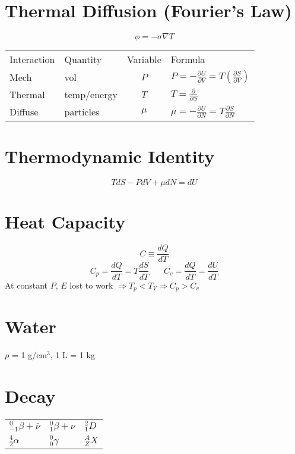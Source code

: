 \documentclass[10pt,a4paper]{article}
\begin{document}
\section{Thermal Diffusion (Fourier's Law)} %
\label{sec:thermal_diffusion_}
\begin{equation}
    \phi = -\sigma \nabla T
\end{equation}

\begin{tabular}{l l c l}
Interaction & Quantity & Variable & Formula\\
Mech & vol & $P$ & $P = -\frac{\partial U}{\partial V}=T \left( \frac{\partial S}{\partial V} \right)$\\
Thermal & temp/energy & $T$ & $T = \frac{\partial }{\partial S}$\\
Diffuse & particles & $\mu$ & $\mu = -\frac{\partial U}{\partial N} = T \frac{\partial S}{\partial N}$
\end{tabular}

\section{Thermodynamic Identity} %
\label{sec:thermo_identity}
\begin{equation}
    T dS - PdV + \mu dN = dU
\end{equation}

\section{Heat Capacity} %
\label{sec:heat_capacity}
\begin{equation}
    C \equiv \frac{dQ}{dT}
\end{equation}
\begin{equation}
    C_p = \frac{dQ}{dT} = T \frac{dS}{dT}~~~~~~~~C_v = \frac{dQ}{dT} = \frac{dU}{dT}
\end{equation}
At constant $P$, $E$ lost to work $\Rightarrow T_p < T_V \Rightarrow C_p > C_v$

\section{Water} %
\label{sec:water}
$\rho$ = 1 g/cm$^3$, 1 L = 1 kg

\section{Decay} %
\label{sec:decay}
\begin{tabular}{ l l l}
$^0_{-1}\beta + \bar{\nu}$ & $^0_1 \beta + \nu$ & $^2_1 D$\\
$^4_2 \alpha$ & $^0_0 \gamma$ & $^A_Z X$
\end{tabular}
\end{document}
